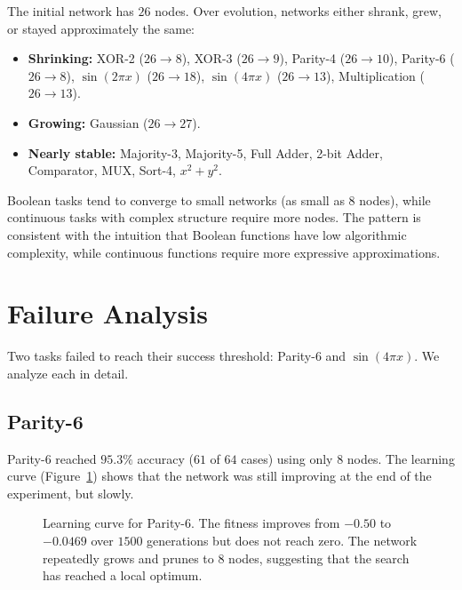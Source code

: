The initial network has $26$ nodes. Over evolution, networks either
shrank, grew, or stayed approximately the same:

\begin{itemize}
  \item \textbf{Shrinking:} XOR-2 ($26 \to 8$), XOR-3 ($26 \to 9$),
    Parity-4 ($26 \to 10$), Parity-6 ($26 \to 8$),
    $\sin(2\pi x)$ ($26 \to 18$), $\sin(4\pi x)$ ($26 \to 13$),
    Multiplication ($26 \to 13$).
  \item \textbf{Growing:} Gaussian ($26 \to 27$).
  \item \textbf{Nearly stable:} Majority-3, Majority-5, Full Adder,
    2-bit Adder, Comparator, MUX, Sort-4, $x^2 + y^2$.
\end{itemize}

Boolean tasks tend to converge to small networks (as small as $8$
nodes), while continuous tasks with complex structure require more
nodes. The pattern is consistent with the intuition that Boolean
functions have low algorithmic complexity, while continuous functions
require more expressive approximations.

\section{Failure Analysis}
\label{sec:results-failure}

Two tasks failed to reach their success threshold: Parity-6 and
$\sin(4\pi x)$. We analyze each in detail.

\subsection{Parity-6}
\label{sec:results-failure-parity6}

Parity-6 reached $95.3\%$ accuracy ($61$ of $64$ cases) using only
$8$ nodes. The learning curve (Figure~\ref{fig:parity6-curve}) shows
that the network was still improving at the end of the experiment,
but slowly.

\begin{figure}[h]
  \centering
  \caption{Learning curve for Parity-6. The fitness improves from
    $-0.50$ to $-0.0469$ over $1500$ generations but does not reach
    zero. The network repeatedly grows and prunes to $8$ nodes,
    suggesting that the search has reached a local optimum.}
  \label{fig:parity6-curve}
\end{figure}

